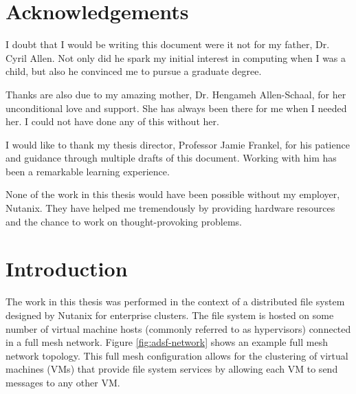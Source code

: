 \documentclass[12pt]{article}
\begin{document}
\clearpage
\newpage
\null

\section*{Acknowledgements}
\thispagestyle{empty}

I doubt that I would be writing this document were it not for my father, Dr.
Cyril Allen. Not only did he spark my initial interest in computing when I was
a child, but also he convinced me to pursue a graduate degree.

Thanks are also due to my amazing mother, Dr. Hengameh Allen-Schaal, for her
unconditional love and support. She has always been there for me when I needed
her. I could not have done any of this without her.

I would like to thank my thesis director, Professor Jamie Frankel, for
his patience and guidance through multiple drafts of this document. Working
with him has been a remarkable learning experience.

None of the work in this thesis would have been possible without my employer,
Nutanix. They have helped me tremendously by providing hardware resources and
the chance to work on thought-provoking problems.

\clearpage
\newpage
\null


\tableofcontents
\newpage

\listoffigures
\newpage

\listoftables
\newpage


\newpage
\FloatBarrier
\section{Introduction}

  The work in this thesis was performed in the context of a distributed file
  system designed by Nutanix for enterprise clusters. The file system is hosted
  on some number of virtual machine hosts (commonly referred to as hypervisors)
  connected in a full mesh network. Figure \ref{fig:adsf-network} shows an
  example full mesh network topology. This full mesh configuration allows for
  the clustering of virtual machines (VMs) that provide file system services by
  allowing each VM to send messages to any other VM.
  
\end{document}
